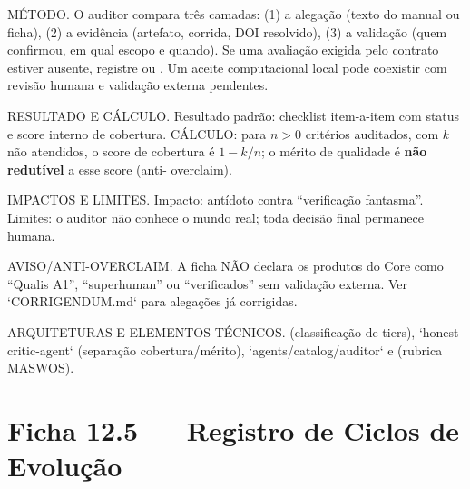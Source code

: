 \begin{metodo}
MÉTODO. O auditor compara três camadas: (1) a alegação (texto do manual ou
ficha), (2) a evidência (artefato, corrida, DOI resolvido), (3) a validação
(quem confirmou, em qual escopo e quando). Se uma avaliação exigida pelo
contrato estiver ausente, registre  ou
. Um aceite computacional local pode coexistir com
revisão humana e validação externa pendentes.
\end{metodo}

\begin{resultado}
RESULTADO E CÁLCULO. Resultado padrão: checklist item-a-item com status
 e score interno de
cobertura. CÁLCULO: para $n>0$ critérios auditados, com $k$ não atendidos,
o score de cobertura é $1-k/n$; o mérito de qualidade é \textbf{não redutível} a esse score (anti-
overclaim).
\end{resultado}

\begin{limite}
IMPACTOS E LIMITES. Impacto: antídoto contra ``verificação fantasma''. Limites:
o auditor não conhece o mundo real; toda decisão final permanece humana.
\end{limite}

\begin{aviso}
AVISO/ANTI-OVERCLAIM. A ficha NÃO declara os produtos do Core como ``Qualis
A1'', ``superhuman'' ou ``verificados'' sem validação externa. Ver
`CORRIGENDUM.md` para alegações já corrigidas.
\end{aviso}

\begin{arquitetura}
ARQUITETURAS E ELEMENTOS TÉCNICOS. 
(classificação de tiers), `honest-critic-agent` (separação cobertura/mérito),
`agents/catalog/auditor` e  (rubrica MASWOS).
\end{arquitetura}

\section{Ficha 12.5 — Registro de Ciclos de Evolução}


